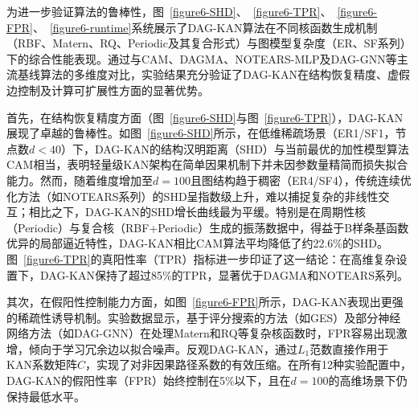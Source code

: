 为进一步验证算法的鲁棒性，图~\ref{figure6-SHD}、~\ref{figure6-TPR}、~\ref{figure6-FPR}、~\ref{figure6-runtime}系统展示了DAG-KAN算法在不同核函数生成机制（RBF、Matern、RQ、Periodic及其复合形式）与图模型复杂度（ER、SF系列）下的综合性能表现。通过与CAM、DAGMA、NOTEARS-MLP及DAG-GNN等主流基线算法的多维度对比，实验结果充分验证了DAG-KAN在结构恢复精度、虚假边控制及计算可扩展性方面的显著优势。

首先，在结构恢复精度方面（图~\ref{figure6-SHD}与图~\ref{figure6-TPR}），DAG-KAN展现了卓越的鲁棒性。如图~\ref{figure6-SHD}所示，在低维稀疏场景（ER1/SF1，节点数$d<40$）下，DAG-KAN的结构汉明距离（SHD）与当前最优的加性模型算法CAM相当，表明轻量级KAN架构在简单因果机制下并未因参数量精简而损失拟合能力。然而，随着维度增加至$d=100$且图结构趋于稠密（ER4/SF4），传统连续优化方法（如NOTEARS系列）的SHD呈指数级上升，难以捕捉复杂的非线性交互；相比之下，DAG-KAN的SHD增长曲线最为平缓。特别是在周期性核（Periodic）与复合核（RBF+Periodic）生成的振荡数据中，得益于B样条基函数优异的局部逼近特性，DAG-KAN相比CAM算法平均降低了约22.6\%的SHD。图~\ref{figure6-TPR}的真阳性率（TPR）指标进一步印证了这一结论：在高维复杂设置下，DAG-KAN保持了超过85\%的TPR，显著优于DAGMA和NOTEARS系列。

其次，在假阳性控制能力方面，如图~\ref{figure6-FPR}所示，DAG-KAN表现出更强的稀疏性诱导机制。实验数据显示，基于评分搜索的方法（如GES）及部分神经网络方法（如DAG-GNN）在处理Matern和RQ等复杂核函数时，FPR容易出现激增，倾向于学习冗余边以拟合噪声。反观DAG-KAN，通过$L_1$范数直接作用于KAN系数矩阵$C$，实现了对非因果路径系数的有效压缩。在所有12种实验配置中，DAG-KAN的假阳性率（FPR）始终控制在5\%以下，且在$d=100$的高维场景下仍保持最低水平。

